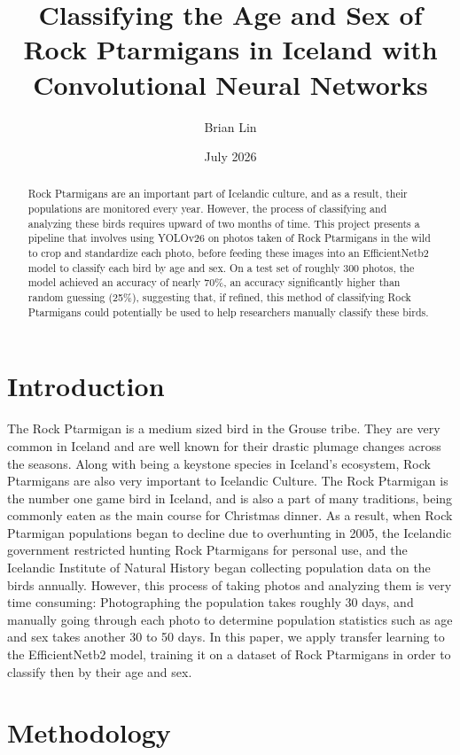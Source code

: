 \documentclass{article}
\title{Classifying the Age and Sex of Rock Ptarmigans in Iceland with Convolutional Neural Networks}
\author{Brian Lin}
\affil{Institute for Computing in Research}
\date{July 2026}
\begin{document}

  
\maketitle

\begin{abstract}
Rock Ptarmigans are an important part of Icelandic culture, and as a result, their populations are monitored every year. However, the process of classifying and analyzing these birds requires upward of two months of time. This project presents a pipeline that involves using YOLOv26 on photos taken of Rock Ptarmigans in the wild to crop and standardize each photo, before feeding these images into an EfficientNetb2 model to classify each bird by age and sex. On a test set of roughly 300 photos, the model achieved an accuracy of 
nearly 70\%, an accuracy significantly higher than random guessing (25\%), suggesting that, if refined, this method of classifying Rock Ptarmigans could potentially be used to help researchers manually classify these birds.
\end{abstract}


\section{Introduction}
The Rock Ptarmigan is a medium sized bird in the Grouse tribe. They are very common in Iceland and are well known for their drastic plumage changes across the seasons. Along with being a keystone species in Iceland's ecosystem, Rock Ptarmigans are also very important to Icelandic Culture. The Rock Ptarmigan is the number one game bird in Iceland, and is also a part of many traditions, being commonly eaten as the main course for Christmas dinner. As a result, when Rock Ptarmigan populations began to decline due to overhunting in 2005, the Icelandic government restricted hunting Rock Ptarmigans for personal use, and the Icelandic Institute of Natural History began collecting population data on the birds annually. However, this process of taking photos and analyzing them is very time consuming: Photographing the population takes roughly 30 days, and manually going through each photo to determine population statistics such as age and sex takes another 30 to 50 days. In this paper, we apply transfer learning to the EfficientNetb2 model, training it on a dataset of Rock Ptarmigans in order to classify then by their age and sex. 

\section{Methodology}
\end{document}
